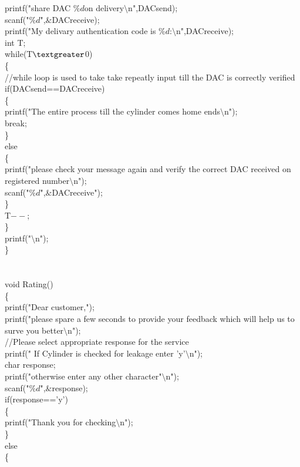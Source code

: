 \documentclass{article}
\begin{document}
{ printf("share DAC $\%d $on delivery$\setminus$n",DACsend);\\
 scanf("$\%d$",$\&$DACreceive);\\
 printf("My delivary authentication code is $\%d$:$\setminus$n",DACreceive);\\
 int T;\\
 while(T$\textgreater$0)\\
 \{\\
 	//while loop is used to take take repeatly input till the DAC is correctly verified\\
 if(DACsend==DACreceive)\\
 \{\\
 printf("The entire process till the cylinder comes home ends$\setminus$n");\\
 break;\\
 \}\\
 else\\
 \{\\
printf("please check your message again and verify the correct DAC received on registered number$\setminus$n");\\
scanf("$\%d$",$\&$DACreceive");\\
 \}\\
 T$--$;\\	
\}\\
printf("$\setminus$n");\\
\}\\
\\
\\
void Rating()\\
\{\\
	printf("Dear customer,");\\
	printf("please spare a few seconds to provide your feedback which will help us to surve you better$\setminus$n");\\
	//Please select appropriate response for the service\\
	printf("  If Cylinder is checked for leakage enter 'y'$\setminus$n");\\
	char response;\\
	printf("otherwise enter any other character"$\setminus$n");\\
	scanf("$\%d$",$\&$response);\\	
	if(response=='y')\\
	\{\\
		printf("Thank you for checking$\setminus$n");\\
	\}\\
	else\\
	\{\\

}
\end{document}
